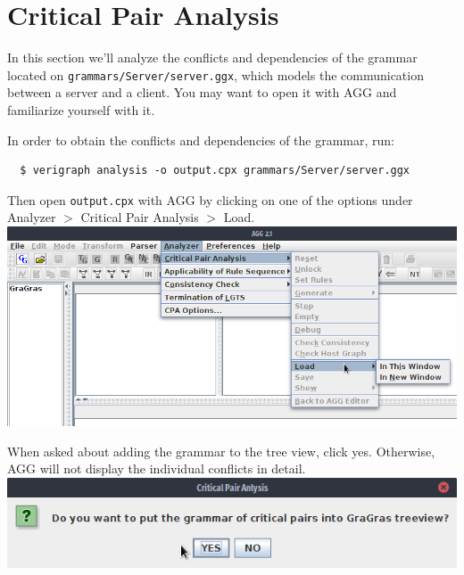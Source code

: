 \documentclass[12pt]{article}
\newenvironment{tutorialstep}
	{\hspace{-\parindent}\begin{minipage}{\textwidth}}
    {\vspace{.3cm}\end{minipage}}
\begin{document}
\pagebreak

\section{Critical Pair Analysis}

In this section we'll analyze the conflicts and dependencies of the grammar located on \texttt{grammars/Server/server.ggx}, which models the communication between a server and a client. You may want to open it with AGG and familiarize yourself with it.

In order to obtain the conflicts and dependencies of the grammar, run:

\begin{verbatim}
  $ verigraph analysis -o output.cpx grammars/Server/server.ggx
\end{verbatim}

\begin{tutorialstep}
Then open \texttt{output.cpx} with AGG by clicking on one of the options under Analyzer $>$ Critical Pair Analysis $>$ Load. \\

\noindent
\centering
\includegraphics[scale = 0.5]{img/cpa/cpa_01.png}
\end{tutorialstep}

\begin{tutorialstep}
When asked about adding the grammar to the tree view, click yes. Otherwise, AGG will not display the individual conflicts in detail. \\

\noindent
\centering
\includegraphics[scale = 0.6]{img/cpa/cpa_02.png}
\end{tutorialstep}
\end{document}
